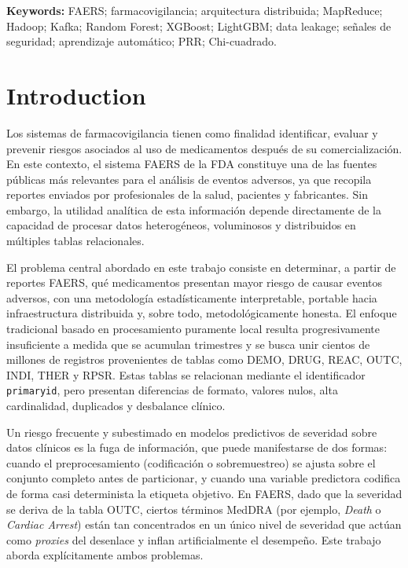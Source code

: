 \documentclass[12pt,a4paper]{article}
\begin{document}
\noindent\textbf{Keywords:} FAERS; farmacovigilancia; arquitectura distribuida; MapReduce; Hadoop; Kafka; Random Forest; XGBoost; LightGBM; data leakage; señales de seguridad; aprendizaje automático; PRR; Chi-cuadrado.

\section{Introduction}

Los sistemas de farmacovigilancia tienen como finalidad identificar, evaluar y prevenir riesgos asociados al uso de medicamentos después de su comercialización. En este contexto, el sistema FAERS de la FDA constituye una de las fuentes públicas más relevantes para el análisis de eventos adversos, ya que recopila reportes enviados por profesionales de la salud, pacientes y fabricantes. Sin embargo, la utilidad analítica de esta información depende directamente de la capacidad de procesar datos heterogéneos, voluminosos y distribuidos en múltiples tablas relacionales.

El problema central abordado en este trabajo consiste en determinar, a partir de reportes FAERS, qué medicamentos presentan mayor riesgo de causar eventos adversos, con una metodología estadísticamente interpretable, portable hacia infraestructura distribuida y, sobre todo, metodológicamente honesta. El enfoque tradicional basado en procesamiento puramente local resulta progresivamente insuficiente a medida que se acumulan trimestres y se busca unir cientos de millones de registros provenientes de tablas como DEMO, DRUG, REAC, OUTC, INDI, THER y RPSR. Estas tablas se relacionan mediante el identificador \texttt{primaryid}, pero presentan diferencias de formato, valores nulos, alta cardinalidad, duplicados y desbalance clínico.

Un riesgo frecuente y subestimado en modelos predictivos de severidad sobre datos clínicos es la fuga de información, que puede manifestarse de dos formas: cuando el preprocesamiento (codificación o sobremuestreo) se ajusta sobre el conjunto completo antes de particionar, y cuando una variable predictora codifica de forma casi determinista la etiqueta objetivo. En FAERS, dado que la severidad se deriva de la tabla OUTC, ciertos términos MedDRA (por ejemplo, \textit{Death} o \textit{Cardiac Arrest}) están tan concentrados en un único nivel de severidad que actúan como \textit{proxies} del desenlace y inflan artificialmente el desempeño. Este trabajo aborda explícitamente ambos problemas.
\end{document}
